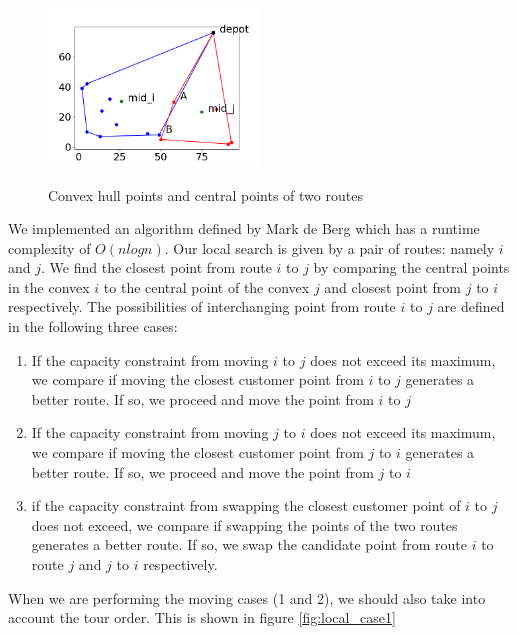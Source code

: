 \documentclass[12pt]{article}
\begin{document}
\begin{figure}[H]
	\caption{Convex hull points and central points of two routes}
	\centering
	\includegraphics[width=0.5\textwidth]{convexmidclosest.png}
	\label{fig:localsearch1}

\end{figure}


We implemented an algorithm defined by Mark de Berg \cite{Berg97} which has a runtime complexity of $O(nlogn)$. Our local search is given by a pair of routes: namely \(i\) and \(j\). We find the closest point from route \(i\) to \(j\) by comparing the central points in the convex \(i\) to the central point of the convex \(j\) and closest point from \(j\) to \(i\) respectively. 
The possibilities of interchanging point from route \(i\) to \(j\) are defined in the following three cases:
\begin{enumerate}

	\item If the capacity constraint from moving \(i\) to \(j\) does not exceed its maximum, we compare if moving the closest customer point from \(i\) to \(j\) generates a better route. If so, we proceed and move the point from \(i\) to \(j\)

	\item If the capacity constraint from moving \(j\) to \(i\) does not exceed its maximum, we compare if moving the closest customer point from \(j\) to \(i\) generates a better route. If so, we proceed and move the point from \(j\) to \(i\)

	\item if the capacity constraint from swapping the closest customer point of \(i\) to \(j\) does not exceed, we compare if swapping the points of the two routes generates a better route. If so, we swap the candidate point from route \(i\) to route \(j\) and \(j\) to \(i\) respectively.
\end{enumerate}

When we are performing  the moving cases (1 and 2), we should also take into account the tour order. This is shown in figure \ref{fig:local_case1}
\newline
\end{document}
